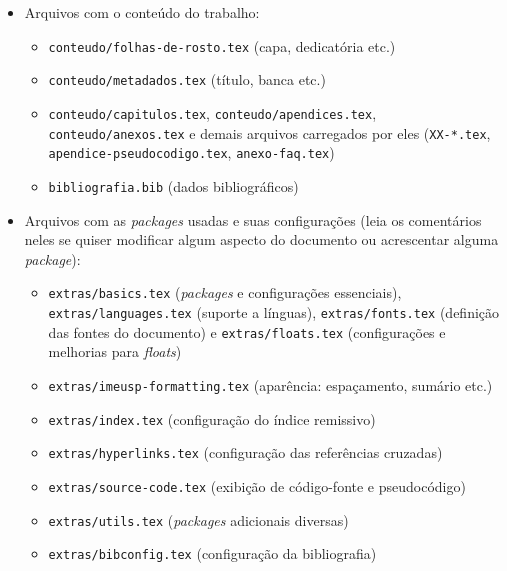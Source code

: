\begin{itemize}
  \item Arquivos com o conteúdo do trabalho:
  \begin{itemize}
    \item \texttt{conteudo/folhas-de-rosto.tex} (capa, dedicatória etc.)
    \item \texttt{conteudo/metadados.tex} (título, banca etc.)
    \item \texttt{conteudo/capitulos.tex}, \texttt{conteudo/apendices.tex},
          \texttt{conteudo/anexos.tex} e demais arquivos carregados por eles
          (\texttt{XX-*.tex}, \texttt{apendice-pseudocodigo.tex}, \texttt{anexo-faq.tex})
    \item \texttt{bibliografia.bib} (dados bibliográficos)
  \end{itemize}

  \item Arquivos com as \textit{packages} usadas e suas configurações (leia
        os comentários neles se quiser modificar algum aspecto do
        documento ou acrescentar alguma \textit{package}):
  \begin{itemize}
    \item \texttt{extras/basics.tex} (\textit{packages} e configurações essenciais),
          \texttt{extras/languages.tex} (suporte a línguas),
          \texttt{extras/fonts.tex} (definição das fontes do documento) e
          \texttt{extras/floats.tex} (configurações e melhorias para \textit{floats})
    \item \texttt{extras/imeusp-formatting.tex} (aparência: espaçamento, sumário etc.)
    \item \texttt{extras/index.tex} (configuração do índice remissivo)
    \item \texttt{extras/hyperlinks.tex} (configuração das referências cruzadas)
    \item \texttt{extras/source-code.tex} (exibição de código-fonte e pseudocódigo)
    \item \texttt{extras/utils.tex} (\textit{packages} adicionais diversas)
    \item \texttt{extras/bibconfig.tex} (configuração da bibliografia)
  \end{itemize}


\end{itemize}
